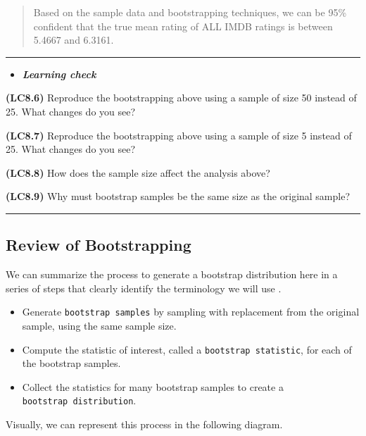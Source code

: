 \documentclass[]{tufte-book}
\let\oldrule=\rule
\renewcommand{\rule}[1]{\oldrule{\linewidth}}
\providecommand{\tightlist}{%
  \setlength{\itemsep}{0pt}\setlength{\parskip}{0pt}}
\newenvironment{rmdblock}[1]
  {\begin{shaded*}
  \begin{itemize}
  \renewcommand{\labelitemi}{
    \raisebox{-.7\height}[0pt][0pt]{
    }
  }
  \item
  }
  {
  \end{itemize}
  \end{shaded*}
  }
\newenvironment{learncheck}
  {\begin{rmdblock}{warning}}
  {\end{rmdblock}}
\begin{document}
\begin{quote}
Based on the sample data and bootstrapping techniques, we can be 95\%
confident that the true mean rating of ALL IMDB ratings is between
5.4667 and 6.3161.
\end{quote}

\begin{center}\rule{0.5\linewidth}{\linethickness}\end{center}

\begin{learncheck}
\textbf{\emph{Learning check}}
\end{learncheck}

\textbf{(LC8.6)} Reproduce the bootstrapping above using a sample of
size 50 instead of 25. What changes do you see?

\textbf{(LC8.7)} Reproduce the bootstrapping above using a sample of
size 5 instead of 25. What changes do you see?

\textbf{(LC8.8)} How does the sample size affect the analysis above?

\textbf{(LC8.9)} Why must bootstrap samples be the same size as the
original sample?

\begin{center}\rule{0.5\linewidth}{\linethickness}\end{center}

\subsection{Review of Bootstrapping}\label{review-of-bootstrapping}

We can summarize the process to generate a bootstrap distribution here
in a series of steps that clearly identify the terminology we will use
\citep{lock2012}.

\begin{itemize}
\tightlist
\item
  Generate \texttt{bootstrap\ samples} by sampling with replacement from
  the original sample, using the same sample size.
\item
  Compute the statistic of interest, called a
  \texttt{bootstrap\ statistic}, for each of the bootstrap samples.
\item
  Collect the statistics for many bootstrap samples to create a
  \texttt{bootstrap\ distribution}.
\end{itemize}

Visually, we can represent this process in the following diagram.
\end{document}
